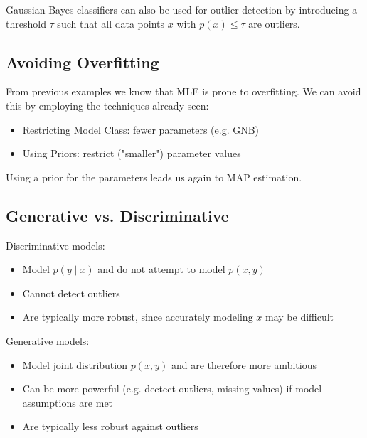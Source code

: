 Gaussian Bayes classifiers can also be used for outlier detection by introducing a threshold $\tau$ such that all data points $x$ with $p(x) \leq \tau$ are outliers.

\subsection{Avoiding Overfitting}

From previous examples we know that MLE is prone to overfitting. We can avoid this by employing the techniques already seen:
\begin{itemize}
	\item Restricting Model Class: fewer parameters (e.g. GNB)
	\item Using Priors: restrict ("smaller") parameter values
\end{itemize}

Using a prior for the parameters leads us again to MAP estimation.

\subsection{Generative vs. Discriminative}

Discriminative models:
\begin{itemize}
	\item Model $p(y \; | \; x)$ and do not attempt to model $p(x,y)$
	\item Cannot detect outliers
	\item Are typically more robust, since accurately modeling $x$ may be difficult
\end{itemize}

Generative models:
\begin{itemize}
	\item Model joint distribution $p(x,y)$ and are therefore more ambitious
	\item Can be more powerful (e.g. dectect outliers, missing values) if model assumptions are met
	\item Are typically less robust against outliers
\end{itemize}
